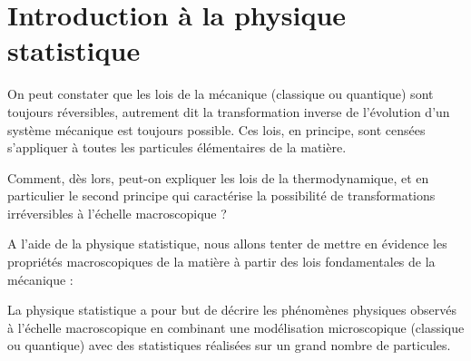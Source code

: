 \documentclass[11pt,fleqn]{book} %
\begin{document}










\setcounter{chapter}{11}

\chapter{Introduction à la physique statistique}

On peut constater que les lois de la mécanique (classique ou quantique) sont toujours réversibles, autrement dit la transformation inverse de l'évolution d'un système mécanique est toujours possible. Ces lois, en principe, sont censées s'appliquer à toutes les particules élémentaires de la matière.

Comment, dès lors, peut-on expliquer les lois de la thermodynamique, et en particulier le second principe qui caractérise la possibilité de transformations irréversibles à l'échelle macroscopique ?

A l'aide de la physique statistique, nous allons tenter de mettre en évidence les propriétés macroscopiques de la matière à partir des lois fondamentales de la mécanique :
\begin{definition}
	La physique statistique a pour but de décrire les phénomènes physiques observés à l'échelle macroscopique en combinant une modélisation microscopique (classique ou quantique) avec des statistiques réalisées sur un grand nombre de particules.
\end{definition}
\end{document}
